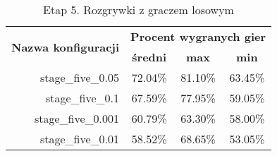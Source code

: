 \begin{longtable}[c]{|r|c|c|c|}
\caption{\label{tab:results/stage_five_all_with_random}Etap 5. Rozgrywki z graczem losowym} \\
\hline

\multirow{2}{*}{\textbf{Nazwa konfiguracji}} & \multicolumn{3}{|c|}{\textbf{Procent wygranych gier}} \\
\cline{2-4}
&\textbf{średni} & \textbf{max} & \textbf{min} \\
\hline
stage\_five\_0.05 & 72.04\% & 81.10\% & 63.45\% \\
\hline
stage\_five\_0.1 & 67.59\% & 77.95\% & 59.05\% \\
\hline
stage\_five\_0.001 & 60.79\% & 63.30\% & 58.00\% \\
\hline
stage\_five\_0.01 & 58.52\% & 68.65\% & 53.05\% \\
\hline
\end{longtable}
